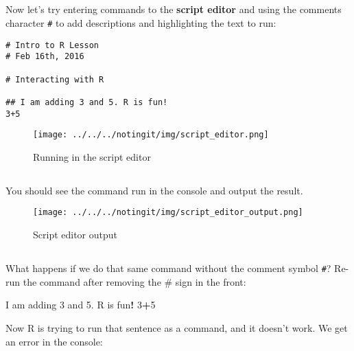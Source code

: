 \documentclass[
]{article}
\newenvironment{Shaded}{\begin{snugshade}}{\end{snugshade}}
\newcommand{\DecValTok}[1]{\textcolor[rgb]{0.00,0.00,0.81}{#1}}
\newcommand{\FloatTok}[1]{\textcolor[rgb]{0.00,0.00,0.81}{#1}}
\newcommand{\NormalTok}[1]{#1}
\newcommand{\OperatorTok}[1]{\textcolor[rgb]{0.81,0.36,0.00}{\textbf{#1}}}
\begin{document}
\hypertarget{section-7}{%
\subsection{}\label{section-7}}

Now let's try entering commands to the \textbf{script editor} and using
the comments character \texttt{\#} to add descriptions and highlighting
the text to run:

\begin{verbatim}
# Intro to R Lesson
# Feb 16th, 2016

# Interacting with R

## I am adding 3 and 5. R is fun!
3+5
\end{verbatim}

\begin{figure}
\centering
\texttt{[image: ../../../notingit/img/script\_editor.png]}
\caption{Running in the script editor}
\end{figure}

\hypertarget{section-8}{%
\subsection{}\label{section-8}}

You should see the command run in the console and output the result.

\begin{figure}
\centering
\texttt{[image: ../../../notingit/img/script\_editor\_output.png]}
\caption{Script editor output}
\end{figure}

\hypertarget{section-9}{%
\subsection{}\label{section-9}}

What happens if we do that same command without the comment symbol
\texttt{\#}? Re-run the command after removing the \# sign in the front:

\begin{Shaded}
\begin{Highlighting}[]
\NormalTok{I am adding }\DecValTok{3}\NormalTok{ and }\FloatTok{5.}\NormalTok{ R is fun}\OperatorTok{!}
\DecValTok{3}\OperatorTok{+}\DecValTok{5}
\end{Highlighting}
\end{Shaded}

Now R is trying to run that sentence as a command, and it doesn't work.
We get an error in the console:
\end{document}
